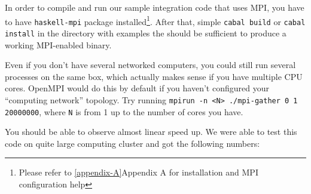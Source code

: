 \documentclass{tmr}
\newcommand{\Todo}[1]{{\textbf{Todo: #1}}}
\begin{document}
In order to compile and run our sample integration code that uses MPI, you have to
have \verb|haskell-mpi| package installed\footnote{Please refer to
  \ref{appendix-A}{Appendix A} for installation and MPI configuration help}. After that,
simple \verb|cabal build| or \verb|cabal install| in the directory
with examples the should be sufficient to produce a working MPI-enabled binary.

Even if you don't have several networked computers, you could still
run several processes on the same box, which actually makes sense if
you have multiple CPU cores. OpenMPI would do this by default if you
haven't configured your ``computing network'' topology. Try running
\verb|mpirun -n <N> ./mpi-gather 0 1 20000000|, where \verb|N| is
from 1 up to the number of cores you have.

You should be able to observe almost linear speed up. We were able to
test this code on quite large computing cluster and got the following
numbers:

\end{document}
